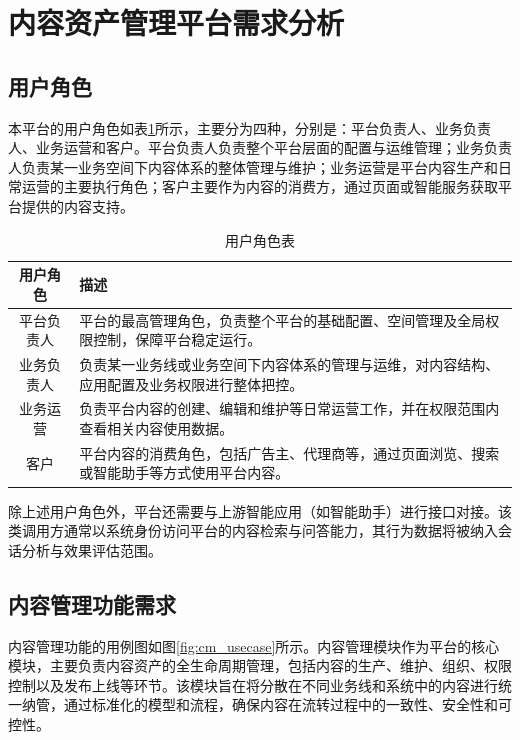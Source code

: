 \section{内容资产管理平台需求分析}

\subsection{用户角色}

本平台的用户角色如表\ref{tab:user_role}所示，主要分为四种，分别是：平台负责人、业务负责人、业务运营和客户。平台负责人负责整个平台层面的配置与运维管理；业务负责人负责某一业务空间下内容体系的整体管理与维护；业务运营是平台内容生产和日常运营的主要执行角色；客户主要作为内容的消费方，通过页面或智能服务获取平台提供的内容支持。

\begin{table}[!htbp]
  \centering
  \caption{用户角色表}
  \label{tab:user_role}
  \small
  \begin{tabularx}{\linewidth}{c|>{\raggedright\arraybackslash}X}
    \hline
    用户角色 & 描述 \\ \hline
    平台负责人 & 平台的最高管理角色，负责整个平台的基础配置、空间管理及全局权限控制，保障平台稳定运行。 \\ \hline
    业务负责人 & 负责某一业务线或业务空间下内容体系的管理与运维，对内容结构、应用配置及业务权限进行整体把控。 \\ \hline
    业务运营 & 负责平台内容的创建、编辑和维护等日常运营工作，并在权限范围内查看相关内容使用数据。 \\ \hline
    客户 & 平台内容的消费角色，包括广告主、代理商等，通过页面浏览、搜索或智能助手等方式使用平台内容。 \\ \hline
  \end{tabularx}
\end{table}

除上述用户角色外，平台还需要与上游智能应用（如智能助手）进行接口对接。该类调用方通常以系统身份访问平台的内容检索与问答能力，其行为数据将被纳入会话分析与效果评估范围。


\subsection{内容管理功能需求}
内容管理功能的用例图如图\ref{fig:cm_usecase}所示。内容管理模块作为平台的核心模块，主要负责内容资产的全生命周期管理，包括内容的生产、维护、组织、权限控制以及发布上线等环节。该模块旨在将分散在不同业务线和系统中的内容进行统一纳管，通过标准化的模型和流程，确保内容在流转过程中的一致性、安全性和可控性。

